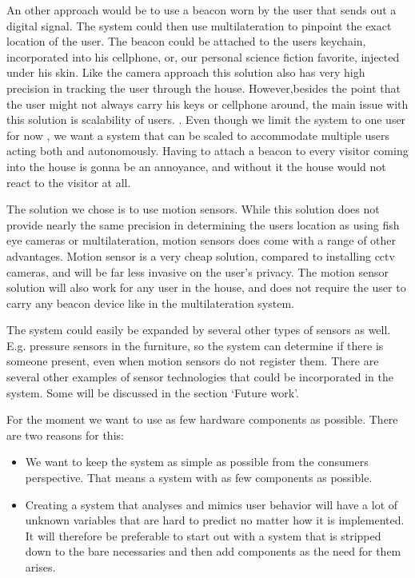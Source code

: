 An other approach would be to use a beacon worn by the user that sends out a digital signal. The system could then use multilateration to pinpoint the exact location of the user. The beacon could be attached to the users keychain, incorporated into his cellphone, or, our personal science fiction favorite, injected under his skin. Like the camera approach this solution also has very high precision in tracking the user through the house. However,besides the point that the user might not always carry his keys or cellphone around, the main issue with this solution is scalability of users. . Even though we limit the system to one user for now , we want a system that can be scaled to accommodate multiple users acting both and autonomously. Having to attach a beacon to every visitor coming into the house is gonna be an annoyance, and without it the house would not react to the visitor at all. 

The solution we chose is to use motion sensors. While this solution does not provide nearly the same precision in determining the users location as using fish eye cameras or multilateration, motion sensors does come with a range of other advantages. Motion sensor is a very cheap solution, compared to installing cctv cameras, and will be far less invasive on the user's privacy. The motion sensor solution will also work for any user in the house, and does not require the user to carry any beacon device like in the multilateration system. 

The system could easily be expanded by several other types of sensors as well. E.g. pressure sensors in the furniture, so the system can determine if there is someone present, even when motion sensors do not register them. There are several other examples of sensor technologies that could be incorporated in the system. Some will be discussed in the section `Future work'. 

For the moment we want to use as few hardware components as possible. There are two reasons for this:

\begin{itemize}
\item We want to keep the system as simple as possible from the consumers perspective. That means a system with as few components as possible.

\item Creating a system that analyses and mimics user behavior will have a lot of unknown variables that are hard to predict no matter how it is implemented. It will therefore be preferable to start out with a system that is stripped down to the bare necessaries and then add components as the need for them arises.

\end{itemize}

